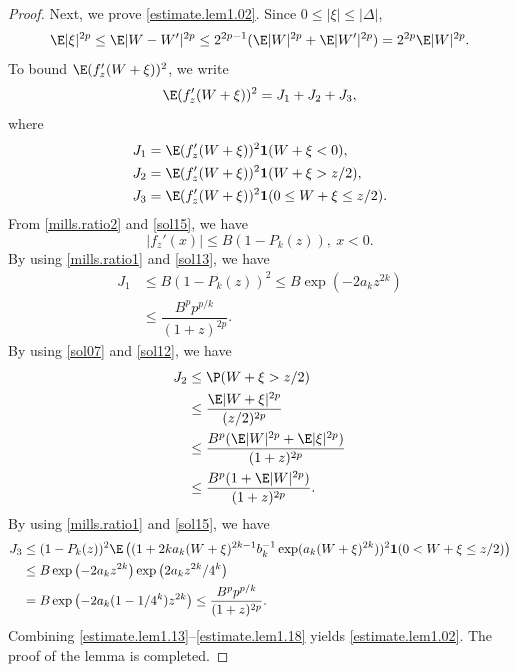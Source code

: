 \begin{proof}
		Next, we prove \eqref{estimate.lem1.02}. Since $0\le |\xi| \le |\Delta|$,
		\begin{equation}\label{sol12}
			\E|\xi|^{2p} \le \E|W-W'|^{2p} \le 2^{2p-1} (\E|W|^{2p}+\E|W'|^{2p})=2^{2p}\E|W|^{2p}.
		\end{equation}
		To bound $\E(f_{z}'(W+\xi))^2$, we write 
		\begin{equation}\label{estimate.lem1.13}
			\E(f_{z}'(W+\xi))^2 =J_1+J_2+J_3,
		\end{equation}
		where
		\begin{equation*}
			\begin{split}
				J_1&=\E (f_{z}'(W+\xi))^2\mathbf{1}(W+\xi< 0),\\
				J_2&=\E (f_{z}'(W+\xi))^2\mathbf{1}(W+\xi>z/2),\\
				J_3&=\E (f_{z}'(W+\xi))^2\mathbf{1}(0\le W+\xi\le z/2).
			\end{split}
		\end{equation*}
		From  \eqref{mills.ratio2} and \eqref{sol15}, we have  
		\begin{equation}\label{sol13}
			|f_{z}'(x)| \le B(1-P_k(z)),\ x<0.
		\end{equation}
		By using \eqref{mills.ratio1} and \eqref{sol13}, we have
		\begin{equation}\label{estimate.lem1.15}
			\begin{split}
				J_1&\le B(1-P_k(z))^2 \le B\exp \left(-2a_k z^{2 k}\right)\\
				&\le \dfrac{B^pp^{p/k}}{(1+z)^{2p}}.
			\end{split} 
		\end{equation}
		By using \eqref{sol07} and \eqref{sol12}, we have
		\begin{equation}\label{estimate.lem1.17}
			\begin{split}
				J_2&\le \P(W+\xi>z/2)\\
				&\le \frac{\E|W+\xi|^{2p}}{(z/2)^{2p}}\\
				&\le \dfrac{B^p(\E|W|^{2p}+\E|\xi|^{2p})}{(1+z)^{2p}} \\
				&\le \dfrac{B^p(1+\E|W|^{2p})}{(1+z)^{2p}}.
			\end{split} 
		\end{equation}
		By using \eqref{mills.ratio1}  and \eqref{sol15}, we have
		\begin{equation}\label{estimate.lem1.18}
			\begin{split}
				J_3&\le (1-P_k(z))^2\E \left(  ( 1 + 2ka_k(W+\xi)^{2k-1}b_k^{-1}\exp({a_k(W+\xi)^{2k}})  )^2\mathbf{1}(0 < W+\xi \le z/2)\right)\\
				&\le B \exp\left(-2a_kz^{2k}\right)\exp\left(2a_kz^{2k}/4^k\right)\\
				&=B\exp\left(-2a_k(1-1/4^k)z^{2k}\right)\le  \dfrac{B^{p}p^{p/k}}{(1+z)^{2p}}.
			\end{split} 
		\end{equation}
		Combining \eqref{estimate.lem1.13}--\eqref{estimate.lem1.18} yields \eqref{estimate.lem1.02}.
		The proof of the lemma is completed.
	\end{proof}
	
